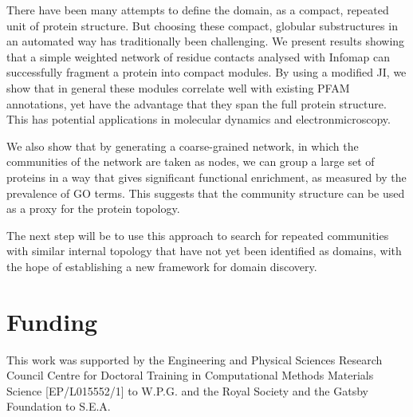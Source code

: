 \documentclass[a4paper,numbib, final, twoside, titelpage]{imaiai}%
\begin{document}
There have been many attempts to define the domain, as a compact, repeated unit of protein structure. But choosing these compact, globular substructures in an automated way has traditionally been challenging. We present results showing that a simple weighted network of residue contacts analysed with Infomap can successfully fragment a protein into compact modules. By using a modified JI, we show that in general these modules correlate well with existing PFAM annotations, yet have the advantage that they span the full protein structure. This has potential applications in molecular dynamics and electron\break microscopy.

We also show that by generating a coarse-grained network, in which the communities of the network are taken as nodes, we can group a large set of proteins in a way that gives significant functional enrichment, as measured by the prevalence of GO terms. This suggests that the community structure can be used as a proxy for the protein topology.

The next step will be to use this approach to search for repeated communities with similar internal topology that have not yet been identified as domains, with the hope of establishing a new framework for domain discovery. %




\section*{Funding}

This work was supported by the Engineering and Physical Sciences Research Council
Centre for Doctoral Training in Computational Methods Materials Science
[EP/L015552/1] to W.P.G. and the Royal Society and the Gatsby Foundation to
S.E.A.
\end{document}
